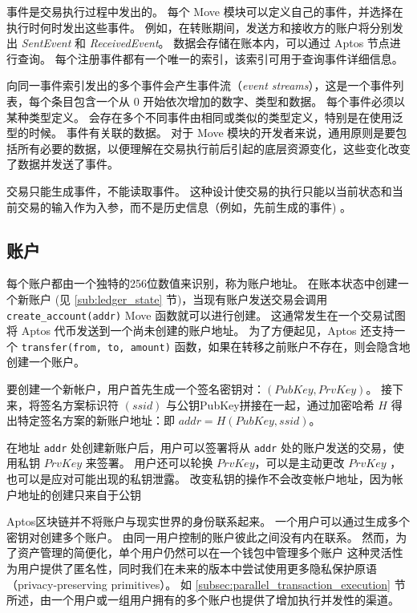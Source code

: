 \documentclass{article}
\begin{document}
事件是交易执行过程中发出的。 每个 Move 模块可以定义自己的事件，并选择在执行时何时发出这些事件。 例如，在转账期间，发送方和接收方的账户将分别发出 \emph{SentEvent} 和 \emph{ReceivedEvent}。 数据会存储在账本内，可以通过 Aptos 节点进行查询。 每个注册事件都有一个唯一的索引，该索引可用于查询事件详细信息。

向同一事件索引发出的多个事件会产生事件流（\emph{event streams}），这是一个事件列表，每个条目包含一个从 0 开始依次增加的数字、类型和数据。 每个事件必须以某种类型定义。 会存在多个不同事件由相同或类似的类型定义，特别是在使用泛型的时候。 事件有关联的数据。 对于 Move 模块的开发者来说，通用原则是要包括所有必要的数据，以便理解在交易执行前后引起的底层资源变化，这些变化改变了数据并发送了事件。

交易只能生成事件，不能读取事件。 这种设计使交易的执行只能以当前状态和当前交易的输入作为入参，而不是历史信息（例如，先前生成的事件) 。

\subsection{账户}
\label{sec:accounts}

每个账户都由一个独特的256位数值来识别，称为账户地址。 在账本状态中创建一个新账户 (见 \ref{sub:ledger_state} 节)，当现有账户发送交易会调用 \texttt{create_account(addr)} Move 函数就可以进行创建。 这通常发生在一个交易试图将 Aptos 代币发送到一个尚未创建的账户地址。 为了方便起见，Aptos 还支持一个 \texttt{transfer(from, to, amount)} 函数，如果在转移之前账户不存在，则会隐含地创建一个账户。


要创建一个新帐户，用户首先生成一个签名密钥对：$(PubKey, PrvKey)$。 接下来，将签名方案标识符 $(ssid)$ 与公钥PubKey拼接在一起，通过加密哈希 $H$ 得出特定签名方案的新账户地址：即 $addr = H(PubKey, ssid)$。

在地址 \texttt{addr} 处创建新账户后，用户可以签署将从 \texttt{addr} 处的账户发送的交易，使用私钥 $PrvKey$ 来签署。 用户还可以轮换 $PrvKey$，可以是主动更改 $PrvKey$ ，也可以是应对可能出现的私钥泄露。 改变私钥的操作不会改变帐户地址，因为帐户地址的创建只来自于公钥

Aptos区块链并不将账户与现实世界的身份联系起来。 一个用户可以通过生成多个密钥对创建多个账户。 由同一用户控制的账户彼此之间没有内在联系。 然而，为了资产管理的简便化，单个用户仍然可以在一个钱包中管理多个账户 这种灵活性为用户提供了匿名性，同时我们在未来的版本中尝试使用更多隐私保护原语（privacy-preserving primitives）。 如 \ref{subsec:parallel_transaction_execution} 节所述，由一个用户或一组用户拥有的多个账户也提供了增加执行并发性的渠道。
\end{document}
